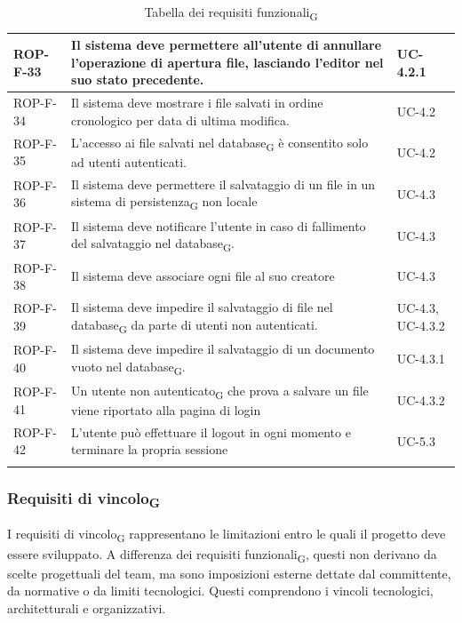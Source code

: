 \documentclass[11pt,a4paper]{article}
\newcommand{\gls}[1]{#1\textsubscript{G}}
\begin{document}
\begin{longtable}{|p{}|>{\raggedright\arraybackslash}p{}|p{}|}
\hline
ROP-F-33 & Il sistema deve permettere all'utente di annullare l'operazione di apertura file, lasciando l'editor nel suo stato precedente. & UC-4.2.1 \\
\hline
ROP-F-34 & Il sistema deve mostrare i file salvati in ordine cronologico per data di ultima modifica. & UC-4.2 \\
\hline
ROP-F-35 & L'accesso ai file salvati nel \gls{database} è consentito solo ad utenti autenticati. & UC-4.2 \\
\hline
ROP-F-36 & Il sistema deve permettere il salvataggio di un file in un \gls{sistema di persistenza} non locale & UC-4.3 \\
\hline
ROP-F-37 & Il sistema deve notificare l'utente in caso di fallimento del salvataggio nel \gls{database}. & UC-4.3 \\
\hline
ROP-F-38 & Il sistema deve associare ogni file al suo creatore & UC-4.3 \\
\hline
ROP-F-39 & Il sistema deve impedire il salvataggio di file nel \gls{database} da parte di utenti non autenticati. & UC-4.3, UC-4.3.2 \\
\hline
ROP-F-40 & Il sistema deve impedire il salvataggio di un documento vuoto nel \gls{database}. & UC-4.3.1 \\
\hline
ROP-F-41 & Un \gls{utente non autenticato} che prova a salvare un file viene riportato alla pagina di login & UC-4.3.2 \\
\hline
ROP-F-42 & L'utente può effettuare il logout in ogni momento e terminare la propria sessione & UC-5.3 \\
\hline
\addlinespace[1em]
\caption{Tabella dei \gls{requisiti funzionali}}
\end{longtable}

\newpage
\subsubsection{\gls{Requisiti di vincolo}}
I \gls{requisiti di vincolo} rappresentano le limitazioni entro le quali il progetto deve essere sviluppato. A differenza dei \gls{requisiti funzionali}, questi non derivano da scelte progettuali del team, ma sono imposizioni esterne dettate dal committente, da normative o da limiti tecnologici. Questi comprendono i vincoli tecnologici, architetturali e organizzativi.
\end{document}
